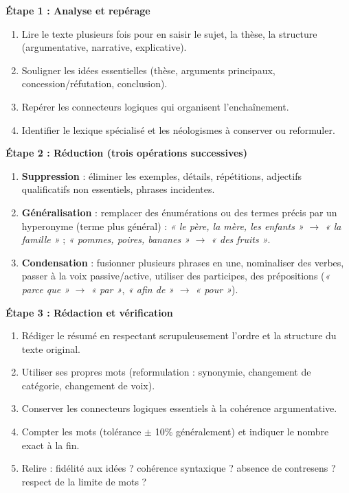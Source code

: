 \documentclass[11pt]{article}
\begin{document}
\begin{methode}
\textbf{Étape 1 : Analyse et repérage}
\begin{enumerate}
    \item Lire le texte plusieurs fois pour en saisir le sujet, la thèse, la structure (argumentative, narrative, explicative).
    \item Souligner les idées essentielles (thèse, arguments principaux, concession/réfutation, conclusion).
    \item Repérer les connecteurs logiques qui organisent l'enchaînement.
    \item Identifier le lexique spécialisé et les néologismes à conserver ou reformuler.
\end{enumerate}
\textbf{Étape 2 : Réduction (trois opérations successives)}
\begin{enumerate}
    \item \textbf{Suppression} : éliminer les exemples, détails, répétitions, adjectifs qualificatifs non essentiels, phrases incidentes.
    \item \textbf{Généralisation} : remplacer des énumérations ou des termes précis par un hyperonyme (terme plus général) : \emph{« le père, la mère, les enfants »} $\rightarrow$ \emph{« la famille »} ; \emph{« pommes, poires, bananes »} $\rightarrow$ \emph{« des fruits »}.
    \item \textbf{Condensation} : fusionner plusieurs phrases en une, nominaliser des verbes, passer à la voix passive/active, utiliser des participes, des prépositions (\emph{« parce que »} $\rightarrow$ \emph{« par »}, \emph{« afin de »} $\rightarrow$ \emph{« pour »}).
\end{enumerate}
\textbf{Étape 3 : Rédaction et vérification}
\begin{enumerate}
    \item Rédiger le résumé en respectant scrupuleusement l'ordre et la structure du texte original.
    \item Utiliser ses propres mots (reformulation : synonymie, changement de catégorie, changement de voix).
    \item Conserver les connecteurs logiques essentiels à la cohérence argumentative.
    \item Compter les mots (tolérance $\pm$ 10\% généralement) et indiquer le nombre exact à la fin.
    \item Relire : fidélité aux idées ? cohérence syntaxique ? absence de contresens ? respect de la limite de mots ?
\end{enumerate}
\end{methode}
\end{document}

